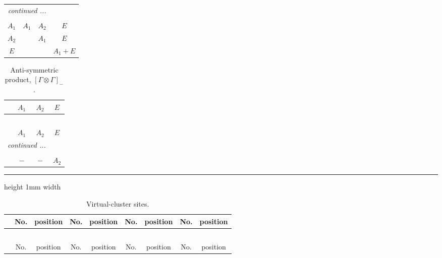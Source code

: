 \documentclass[fleqn,10pt,landscape]{article}
\begin{document}
\begin{itemize}
\begin{center}
\begin{longtable}{c|ccc}
 \hline \hline
\multicolumn{3}{r}{\footnotesize\it continued ...} \\ \endfoot

 \hline \hline
\multicolumn{3}{r}{} \\ \endlastfoot

$ A_{1} $ & $ A_{1} $ & $ A_{2} $ & $ E $ \\
$ A_{2} $ & $  $ & $ A_{1} $ & $ E $ \\
$ E $ & $  $ & $  $ & $ A_{1} + E $ \\
\end{longtable}
\end{center}
\begin{center}
\renewcommand{\arraystretch}{1.0}
\begin{longtable}{cccc}
\caption{Anti-symmetric product, $[\Gamma\otimes\Gamma]_-$.}
 \\
 \hline \hline
 & $ A_{1} $ & $ A_{2} $ & $ E $ \\ \hline \endfirsthead

\multicolumn{3}{l}{\tablename\ \thetable{}} \\
 \hline \hline
 & $ A_{1} $ & $ A_{2} $ & $ E $ \\ \hline \endhead

 \hline \hline
\multicolumn{3}{r}{\footnotesize\it continued ...} \\ \endfoot

 \hline \hline
\multicolumn{3}{r}{} \\ \endlastfoot

$  $ & $ - $ & $ - $ & $ A_{2} $ \\
\end{longtable}
\end{center}

 \hfil \hrule height 1mm width \textwidth \hfil

{
\scriptsize
\begin{center}
\renewcommand{\arraystretch}{1.7}
\begin{longtable}{ccccccccc}
\caption{Virtual-cluster sites.}
 \\
 \hline \hline
 & No. & position & No. & position & No. & position & No. & position \\ \hline \endfirsthead

\multicolumn{8}{l}{\tablename\ \thetable{}} \\
 \hline \hline
 & No. & position & No. & position & No. & position & No. & position \\ \hline \endhead


\end{longtable}
\end{center}}
\end{itemize}
\end{document}
